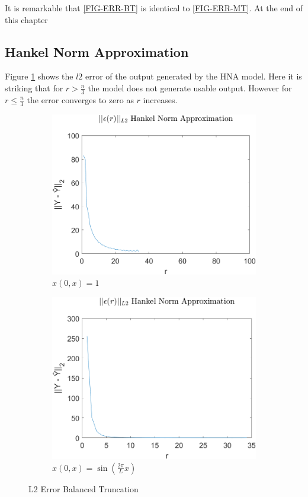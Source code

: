 It is remarkable that \ref{FIG-ERR-BT} is identical to \ref{FIG-ERR-MT}.
At the end of this chapter

\subsection{Hankel Norm Approximation}
Figure \ref{FIG-ERR-HNA} shows the \(l2\) error of the output generated by the HNA model.
Here it is striking that for \(r > \frac{n}{3}\) the model does not generate usable output.
However for \(r \leq \frac{n}{3}\) the error converges to zero as \(r\) increases.

\begin{figure}[H]
\begin{subfigure}[b]{0.5\textwidth}
\centering
\includegraphics[width=\textwidth]{images/L2_HNA}
\caption{$x(0, x) = 1$}
\label{FIG-ERR-HNA}
\end{subfigure}
\begin{subfigure}[b]{0.5\textwidth}
\centering
\includegraphics[width=\textwidth]{images/L2_HNA_SIN}
\caption{$x(0, x) = \sin(\frac{2\pi}{L}x)$}
\label{FIG-ERR-HNA-SIN}
\end{subfigure}
\caption{L2 Error Balanced Truncation}
\end{figure}
